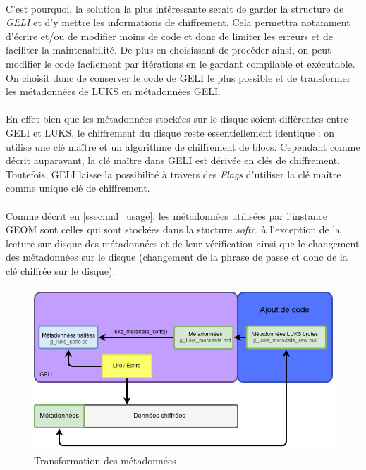 \paragraph{}
C'est pourquoi, la solution la plus intéressante serait de garder la structure
de \textit{GELI} et d'y mettre les informations de chiffrement. Cela permettra 
notamment d'écrire et/ou de modifier moins de code et donc de limiter les erreurs
et de faciliter la maintenabilité. De plus en choisissant de procéder ainsi, on
peut modifier le code facilement par itérations en le gardant compilable et 
exécutable. On choisit donc de conserver le code de 
GELI le plus possible et de transformer les métadonnées de LUKS en métadonnées 
GELI.

\paragraph{}
En effet bien que les métadonnées stockées sur le disque soient différentes 
entre GELI et LUKS, le chiffrement du disque reste essentiellement identique :
on utilise une clé maître et un algorithme de chiffrement de blocs. Cependant 
comme décrit auparavant, la clé maître dans GELI est dérivée en clés de 
chiffrement. Toutefois, GELI laisse la possibilité à travers des {\em Flags} 
d'utiliser la clé maître comme unique clé de chiffrement.

\paragraph{}
Comme décrit en \ref{ssec:md_usage}, les métadonnées utilisées par l'instance
GEOM sont celles qui sont stockées dans la stucture {\em softc}, à l'exception
de la lecture sur disque des métadonnées et de leur vérification ainsi que le 
changement des métadonnées sur le disque (changement de la phrase de passe et
donc de la clé chiffrée sur le disque).

\paragraph{}
\begin{figure}[h]
\centering
\includegraphics[width=.9\linewidth]{choix_developpement/utilisation_metadonnee_luks.png}
\caption{\label{fig:transformation_md}Transformation des métadonnées}
\end{figure}

